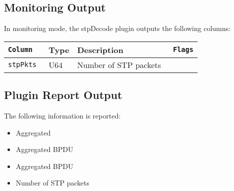 \documentclass[documentation]{subfiles}
\begin{document}
\subsection{Monitoring Output}
In monitoring mode, the stpDecode plugin outputs the following columns:
\begin{longtable}{>{\tt}lll>{\tt\small}l}
    \toprule
    {\bf Column} & {\bf Type} & {\bf Description} & {\bf Flags}\\
    \midrule\endhead%
    stpPkts & U64 & Number of STP packets & \\
    \bottomrule
\end{longtable}

\subsection{Plugin Report Output}
The following information is reported:
\begin{itemize}
    \item Aggregated {\tt{}}
    \item Aggregated BPDU {\tt{}}
    \item Aggregated BPDU {\tt{}}
    \item Number of STP packets
\end{itemize}
\end{document}
